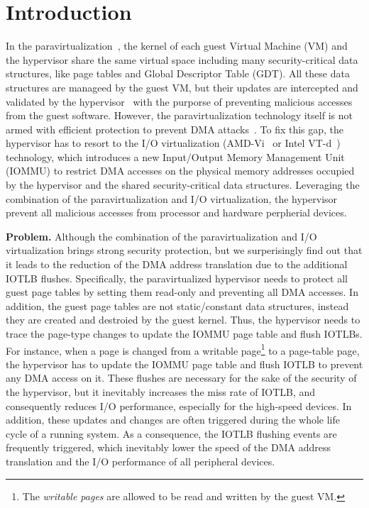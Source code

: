\section{Introduction} \label{sec:intro}
In the paravirtualization~\cite{XEN-SOSP03,denali-paravirtualization}, the kernel of each guest Virtual Machine (VM) and the hypervisor share the same virtual space including many security-critical data structures, like page tables and Global Descriptor Table (GDT). All these data structures are manageed by the guest VM, but their updates are intercepted and validated by the hypervisor~\cite{XEN-SOSP03} with the purporse of preventing malicious accesses from the guest software.
However, the paravirtualization technology itself is not armed with efficient protection to prevent DMA attacks~\cite{disaggregation}.
To fix this gap, the hypervisor has to resort to the I/O virtualization (AMD-Vi~\cite{amdvt} or Intel VT-d~\cite{intelvt}) technology, which introduces a new Input/Output Memory Management Unit (IOMMU) to restrict DMA accesses on the physical memory addresses occupied by the hypervisor and the shared security-critical data structures. 
Leveraging the combination of the paravirtualization and I/O virtualization, the hypervisor prevent all malicious accesses from processor and hardware perpherial devices.

\textbf{Problem.} Although the combination of the paravirtualization and I/O virtualization brings strong security protection, but we surperisingly find out that it leads to the reduction of the DMA address translation due to the additional IOTLB flushes. 
Specifically, the paravirtualized hypervisor needs to protect all guest page tables 
by setting them read-only and preventing all DMA accesses.  
In addition, the guest page tables are not static/constant data structures, 
instead they are created and destroied by the guest kernel.
Thus, the hypervisor needs to trace the page-type changes to update the IOMMU page table and flush IOTLBs.
For instance, when a page is changed from a writable page\footnote{The \emph{writable pages} are allowed to be read and written by the guest VM.}  
to a page-table page, the hypervisor has to update the IOMMU page table and flush IOTLB to prevent any DMA access on it.
These flushes are necessary for the sake of the security of the hypervisor, but it inevitably increases the miss rate of IOTLB, and consequently reduces I/O performance, especially for the high-speed devices. 
In addition, these updates and changes are often triggered during the whole life cycle of a running system.
As a consequence, the IOTLB flushing events are frequently triggered, which inevitably lower the speed of the DMA address translation and the I/O performance of all peripheral devices.

